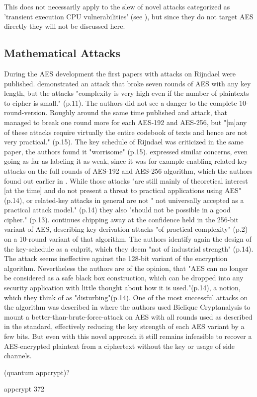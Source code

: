 This does not necessarily apply to the slew of novel attacks categorized as 'transient execution CPU vulnerabilities' (see \cite{transientexecution}), but since they do not target AES directly they will not be discussed here.

\subsection{Mathematical Attacks}
\label{ch:mathematicalattacks}

During the AES development the first papers with attacks on Rijndael were published. \cite{Gilbert00acollision} demonstrated an attack that broke seven rounds of AES with any key length, but the attacks "complexity is very high even if the number of plaintexts to cipher is small." (p.11). The authors did not see a danger to the complete 10-round-version.
Roughly around the same time \cite{impcryptan} published and attack, that managed to break one round more for each AES-192 and AES-256, but "[m]any of these attacks require virtually the entire codebook of texts and hence are not very practical." (p.15).
The key schedule of Rijndael was criticized in the same paper, the authors found it "worrisome" (p.15). \cite{rkeyattack} expressed similar concerns, even going as far as labeling it as weak, since it was for example enabling related-key attacks on the full rounds of AES-192 and AES-256 algorithm, which the authors found out earlier in \cite{rkeyattack2}.  While those attacks "are still mainly of theoretical interest [at the time] and do not present a threat to practical applications using AES" (p.14), or related-key attacks in general are not " not universally accepted as a practical attack model."\cite{rkeyattack3} (p.14) they also "should not be possible in a good cipher." \cite{rkeyattack} (p.13).
\cite{rkeyattack3} continues chipping away at the confidence held in the 256-bit variant of AES, describing key derivation attacks "of practical complexity" (p.2) on a 10-round variant of that algorithm. The authors identify again the design of the key-schedule as a culprit, which they deem "not of industrial strength" (p.14). The attack seems ineffective against the 128-bit variant of the encryption algorithm. Nevertheless the authors are of the opinion, that "AES can no longer be considered as a safe black box construction, which can be dropped into any security application with little thought about how it is used."(p.14), a notion, which they think of as "disturbing"(p.14).
One of the most successful attacks on the algorithm was described in \cite{biclique} where the authors used Biclique Cryptanalysis to mount a better-than-brute-force-attack on AES with all rounds used as described in the standard, effectively reducing the key strength of each AES variant by a few bits. But even with this novel approach it still remains infeasible to recover a AES-encrypted plaintext from a ciphertext without the key or usage of side channels.

(quantum appcrypt)?

appcrypt 372
